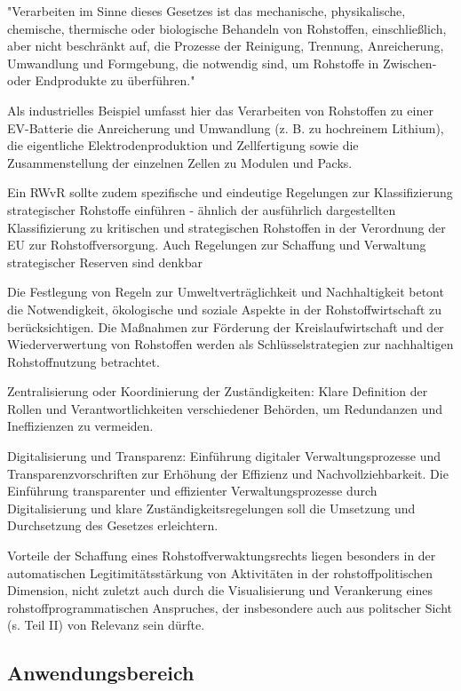 \documentclass[12pt,a4paper,oneside]{book} %
\begin{document}
"Verarbeiten im Sinne dieses Gesetzes ist das mechanische, physikalische, chemische, thermische oder biologische Behandeln von Rohstoffen, einschließlich, aber nicht beschränkt auf, die Prozesse der Reinigung, Trennung, Anreicherung, Umwandlung und Formgebung, die notwendig sind, um Rohstoffe in Zwischen- oder Endprodukte zu überführen."

Als industrielles Beispiel umfasst hier das Verarbeiten von Rohstoffen zu einer EV-Batterie die Anreicherung und Umwandlung (z. B. zu hochreinem Lithium), die eigentliche Elektrodenproduktion und Zellfertigung sowie die Zusammenstellung der einzelnen Zellen zu Modulen und Packs.

Ein RWvR sollte zudem spezifische und eindeutige Regelungen zur Klassifizierung strategischer Rohstoffe einführen - ähnlich der ausführlich dargestellten Klassifizierung zu kritischen und strategischen Rohstoffen in der Verordnung der EU zur Rohstoffversorgung. Auch Regelungen zur Schaffung und Verwaltung strategischer Reserven sind denkbar  %

Die Festlegung von Regeln zur Umweltverträglichkeit und Nachhaltigkeit betont die Notwendigkeit, ökologische und soziale Aspekte in der Rohstoffwirtschaft zu berücksichtigen.
Die Maßnahmen zur Förderung der Kreislaufwirtschaft und der Wiederverwertung von Rohstoffen werden als Schlüsselstrategien zur nachhaltigen Rohstoffnutzung betrachtet.

Zentralisierung oder Koordinierung der Zuständigkeiten: Klare Definition der Rollen und Verantwortlichkeiten verschiedener Behörden, um Redundanzen und Ineffizienzen zu vermeiden.

Digitalisierung und Transparenz: Einführung digitaler Verwaltungsprozesse und Transparenzvorschriften zur Erhöhung der Effizienz und Nachvollziehbarkeit.
Die Einführung transparenter und effizienter Verwaltungsprozesse durch Digitalisierung und klare Zuständigkeitsregelungen soll die Umsetzung und Durchsetzung des Gesetzes erleichtern.

Vorteile der Schaffung eines Rohstoffverwaktungsrechts liegen besonders in der automatischen Legitimitätsstärkung von Aktivitäten in der rohstoffpolitischen Dimension, nicht zuletzt auch durch die Visualisierung und Verankerung eines rohstoffprogrammatischen Anspruches, der insbesondere auch aus politscher Sicht (s. Teil II) von Relevanz sein dürfte.

\subsection{Anwendungsbereich}
\end{document}
